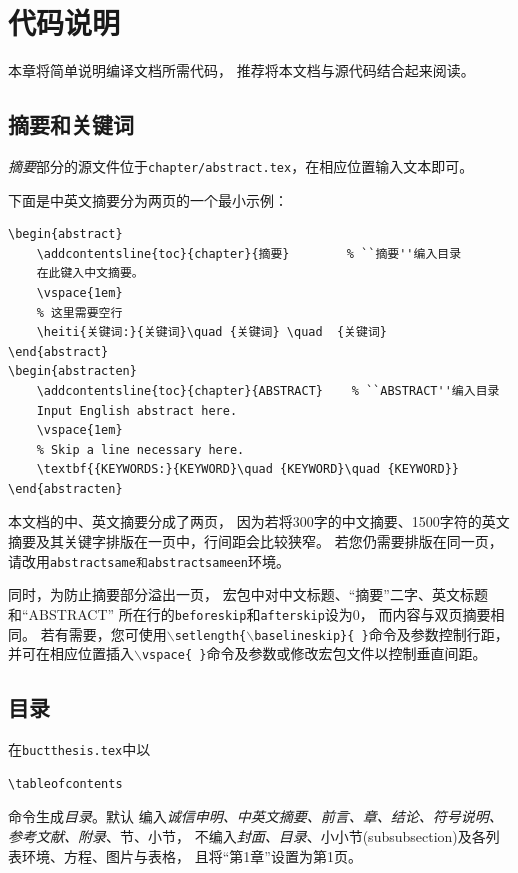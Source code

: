 \chapter{代码说明}\label{chap:CodeIntro}
本章将简单说明编译文档所需代码，
推荐将本文档与源代码结合起来阅读。


\section{摘要和关键词}\label{sec:abstract}
    \emph{摘要}部分的源文件位于\texttt{chapter/abstract.tex}，在相应位置输入文本即可。

    下面是中英文摘要分为两页的一个最小示例：

    \begin{lstlisting}[caption=双页摘要\LaTeX{} 代码最小示例]
\begin{abstract}
    \addcontentsline{toc}{chapter}{摘要}        % ``摘要''编入目录
	在此键入中文摘要。
	\vspace{1em}
    % 这里需要空行
	\heiti{关键词:}{关键词}\quad {关键词} \quad  {关键词}
\end{abstract}
\begin{abstracten}
    \addcontentsline{toc}{chapter}{ABSTRACT}    % ``ABSTRACT''编入目录
	Input English abstract here.
	\vspace{1em}
    % Skip a line necessary here.
	\textbf{{KEYWORDS:}{KEYWORD}\quad {KEYWORD}\quad {KEYWORD}}
\end{abstracten}        
    \end{lstlisting}

    本文档的中、英文摘要分成了两页，
    因为若将300字的中文摘要、1500字符的英文摘要及其关键字排版在一页中，行间距会比较狭窄。
    若您仍需要排版在同一页，请改用\texttt{abstractsame和abstractsameen}环境。

    同时，为防止摘要部分溢出一页，
    宏包中对中文标题、``摘要''二字、英文标题和``ABSTRACT''
    所在行的\texttt{beforeskip}和\texttt{afterskip}设为0，
    而内容与双页摘要相同。
    若有需要，您可使用\texttt{$\backslash$setlength\{$\backslash$baselineskip\}\{\ \}}命令及参数控制行距，并可在相应位置插入\texttt{$\backslash$vspace\{ \}}命令及参数或修改宏包文件以控制垂直间距。


\section{目录}\label{sec:content}
    在\texttt{buctthesis.tex}中以

    \begin{lstlisting}[firstnumber=38]
\tableofcontents
    \end{lstlisting}
    命令生成\emph{目录}。默认
    编入\emph{诚信申明、中英文摘要、前言、章、结论、符号说明、参考文献、附录}、节、小节，
    不编入\emph{封面、目录}、小小节(subsubsection)及各列表环境、方程、图片与表格，
    且将``第1章''设置为第1页。
    
